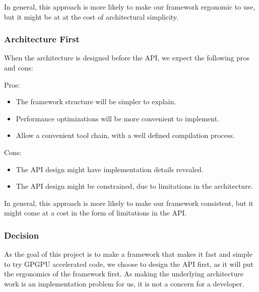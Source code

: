 In general, this approach is more likely to make our framework ergonomic to use, but it might be at at the cost of architectural simplicity. 

\subsubsection{Architecture First}
When the architecture is designed before the API, we expect the following pros and cons:

Pros:
\begin{itemize}
\item The framework structure will be simpler to explain.
\item Performance optimizations will be more convenient to implement.
\item Allow a convenient tool chain, with a well defined compilation process.
\end{itemize}

Cons:
\begin{itemize}
\item The API design might have implementation details revealed.
\item The API design might be constrained, due to limitations in the architecture.
\end{itemize}

In general, this approach is more likely to make our framework consistent, but it might come at a cost in the form of limitations in the API. 

%
%

\subsubsection{Decision}
As the goal of this project is to make a framework that makes it fast and simple to try GPGPU accelerated code, we choose to design the API first, as it will put the ergonomics of the framework first. As making the underlying architecture work is an implementation problem for us, it is not a concern for a developer.